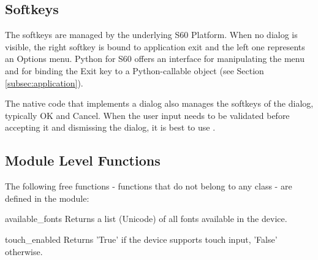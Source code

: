 \subsection{Softkeys}
\label{subsec:softkeys}
The softkeys are managed by the underlying S60 Platform. When no
dialog is visible, the right softkey is bound to application exit and
the left one represents an Options menu. Python for S60 offers
an interface for manipulating the menu and for binding the Exit key to
a Python-callable object (see Section \ref{subsec:application}). 

The native code that implements a dialog also manages the softkeys of the 
dialog, typically OK and Cancel. When the user input needs to be validated 
before accepting it and dismissing the dialog, it is best to use 
.

\subsection{Module Level Functions}
\label{subsec:module}
The following free functions - functions that do not belong to any class 
- are defined in the  module:

\begin{funcdesc}{available_fonts}{}
Returns a list (Unicode) of all fonts available in the device.
\end{funcdesc}

\begin{funcdesc}{touch_enabled}{}
Returns 'True' if the device supports touch input, 'False' otherwise.
\end{funcdesc}


